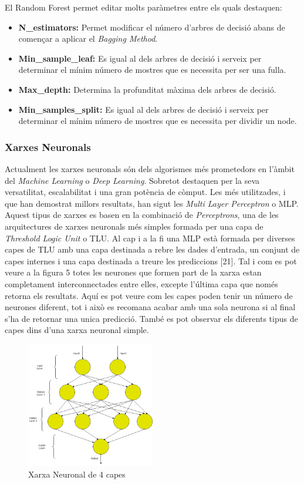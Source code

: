 \documentclass[10pt,a4paper,twocolumn,twoside]{article}
\begin{document}
El Random Forest permet editar molts paràmetres entre els quals destaquen:
 \begin{itemize}
\item \textbf{N\_estimators:} Permet modificar el número d'arbres de decisió abans de començar a aplicar el \textit{Bagging Method}.
\item \textbf{Min\_sample\_leaf:} Es igual al dels arbres de decisió i serveix per determinar el mínim número de mostres que es necessita per ser una fulla.
\item \textbf{Max\_depth:} Determina la profunditat màxima dels arbres de decisió.
\item \textbf{Min\_samples\_split:} Es igual al dels arbres de decisió i serveix per determinar el mínim número de mostres que es necessita per dividir un node.
\end{itemize}

\subsubsection{Xarxes Neuronals}
Actualment les xarxes neuronals són dels algorismes més prometedors en l'àmbit del \textit{Machine Learning} o \textit{Deep Learning}. Sobretot destaquen per la seva versatilitat, escalabilitat i una gran potència de còmput. Les més utilitzades, i que han demostrat millors resultats, han sigut les \textit{Multi Layer Perceptron} o MLP. Aquest tipus de xarxes es basen en la combinació de \textit{Perceptrons}, una de les arquitectures de xarxes neuronals més simples formada per una capa de \textit{Threshold Logic Unit} o TLU. Al cap i a la fi una MLP està formada per diverses capes de TLU amb una capa destinada a rebre les dades d'entrada, un conjunt de capes internes i una capa destinada a treure les prediccions [21]. Tal i com es pot veure a la figura 5 totes les neurones que formen part de la xarxa estan completament interconnectades entre elles, excepte l'última capa que només retorna els resultats. Aquí es pot veure com les capes poden tenir un número de neurones diferent, tot i això es recomana acabar amb una sola neurona si al final s'ha de retornar una unica predicció. També es pot observar els diferents tipus de capes dins d'una xarxa neuronal simple.
 \begin{figure}[!h]
\centering
	\includegraphics[width=0.5\textwidth]{../img/XarxaNeur}
	\caption{Xarxa Neuronal de 4 capes}
	\label{fig-XarxaNeur}
\end{figure}
\end{document}
